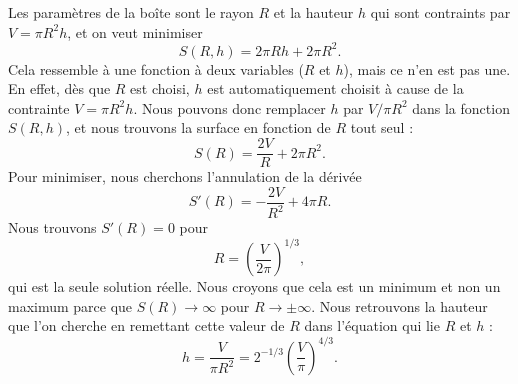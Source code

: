 \begin{corrige}{3}

Les paramètres de la boîte sont le rayon $R$ et la hauteur $h$ qui sont contraints par $V=\pi R^2h$, et on veut minimiser
\begin{equation}
	S(R,h)=2\pi Rh+2\pi R^2.
\end{equation}
Cela ressemble à une fonction à deux variables ($R$ et $h$), mais ce n'en est pas une. En effet, dès que $R$ est choisi, $h$ est automatiquement choisit à cause de la contrainte $V=\pi R^2h$. Nous pouvons donc remplacer $h$ par $V/\pi R^2$ dans la fonction $S(R,h)$, et nous trouvons la surface en fonction de $R$ tout seul :
\begin{equation}
	S(R)=\frac{ 2V }{ R }+2\pi R^2.
\end{equation}
Pour minimiser, nous cherchons l'annulation de la dérivée
\begin{equation}
	S'(R)=-\frac{ 2V }{ R^2 }+4\pi R.
\end{equation}
Nous trouvons $S'(R)=0$ pour
\begin{equation}
	R=\left( \frac{ V }{ 2\pi } \right)^{1/3},
\end{equation}
qui est la seule solution réelle. Nous croyons que cela est un minimum et non un maximum parce que $S(R)\to\infty$ pour $R\to\pm\infty$. Nous retrouvons la hauteur que l'on cherche en remettant cette valeur de $R$ dans l'équation qui lie $R$ et $h$ :
\begin{equation}
	h=\frac{ V }{ \pi R^2 }=2^{-1/3}\left( \frac{ V }{ \pi } \right)^{4/3}.
\end{equation}

\end{corrige}
